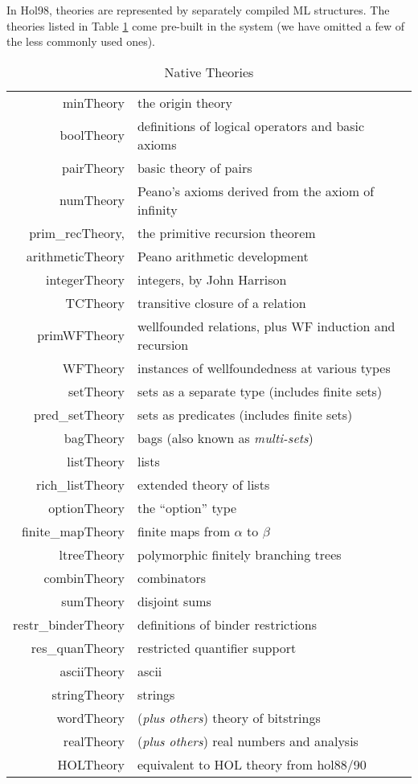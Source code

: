 \documentclass[12pt,fleqn,a4paper]{report}
\begin{document}
In Hol98, theories are represented by separately compiled ML
structures. The theories listed in Table \ref{nativeTheories} come
pre-built in the system (we have omitted a few of the less commonly used
ones).
\begin{table}
\begin{center}
\begin{tabular}{|r|l|} \hline
minTheory & the origin theory \\
boolTheory & definitions of logical operators and basic axioms \\
pairTheory & basic theory of pairs \\
numTheory & Peano's axioms derived from the axiom of infinity \\
prim\_recTheory, & the primitive recursion theorem \\
arithmeticTheory & Peano arithmetic development \\
integerTheory & integers, by John Harrison \\
TCTheory & transitive closure of a relation \\
primWFTheory & wellfounded relations, plus WF induction and recursion \\
WFTheory & instances of wellfoundedness at various types \\
setTheory & sets as a separate type (includes finite sets) \\
pred\_setTheory & sets as predicates (includes finite sets) \\
bagTheory & bags (also known as \emph{multi-sets})\\
listTheory & lists  \\
rich\_listTheory & extended theory of lists \\
optionTheory & the ``option'' type \\
finite\_mapTheory & finite maps from $\alpha$ to $\beta$ \\
ltreeTheory & polymorphic finitely branching trees \\
combinTheory & combinators \\
sumTheory & disjoint sums \\
restr\_binderTheory & definitions of binder restrictions \\
res\_quanTheory & restricted quantifier support \\
asciiTheory & ascii \\
stringTheory & strings \\
wordTheory & ({\it plus others}) theory of bitstrings \\
realTheory & ({\it plus others}) real numbers and analysis \\
HOLTheory & equivalent to HOL theory from hol88/90\\  \hline
\end{tabular}
\caption{Native Theories}\label{nativeTheories}
\end{center}
\end{table}
\end{document}
